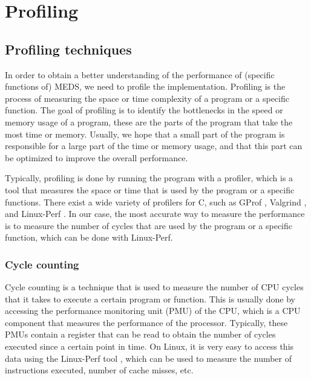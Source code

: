 \documentclass[11pt,a4paper]{report}
\theoremstyle{definition}
\begin{document}
\chapter{Profiling}
\label{ch:profiling}
\section{Profiling techniques}
In order to obtain a better understanding of the performance of (specific functions of) MEDS, we need to profile the implementation. Profiling is the process of measuring the space or time complexity of a program or a specific function. The goal of profiling is to identify the bottlenecks in the speed or memory usage of a program, these are the parts of the program that take the most time or memory. Usually, we hope that a small part of the program is responsible for a large part of the time or memory usage, and that this part can be optimized to improve the overall performance.

Typically, profiling is done by running the program with a profiler, which is a tool that measures the space or time that is used by the program or a specific functions. There exist a wide variety of profilers for C, such as GProf \cite{graham1982gprof}, Valgrind \cite{nethercote2007valgrind}, and Linux-Perf \cite{de2010new}. In our case, the most accurate way to measure the performance is to measure the number of cycles that are used by the program or a specific function, which can be done with Linux-Perf.

\subsection{Cycle counting}
Cycle counting is a technique that is used to measure the number of CPU cycles that it takes to execute a certain program or function. This is usually done by accessing the performance monitoring unit (PMU) of the CPU, which is a CPU component that measures the performance of the processor. Typically, these PMUs contain a register that can be read to obtain the number of cycles executed since a certain point in time. On Linux, it is very easy to access this data using the Linux-Perf tool \cite{de2010new}, which can be used to measure the number of instructions executed, number of cache misses, etc.
\end{document}
